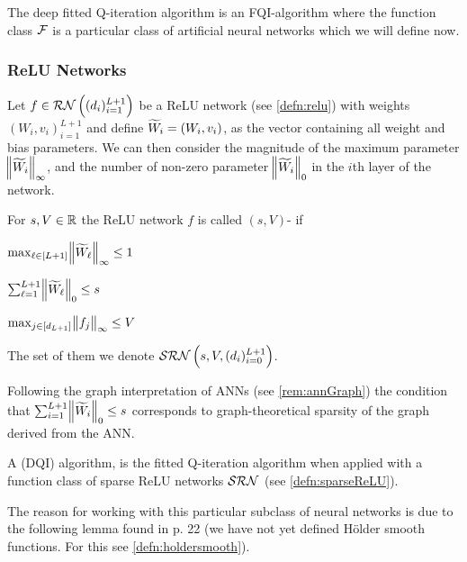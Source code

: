 The deep fitted Q-iteration algorithm is an FQI-algorithm where the
function class $\mathcal{F}$ is a particular class of artificial neural networks
which we will define now.

\subsubsection{ReLU Networks}
Let $f \in \mathcal{RN}\left((d_i)_{i=1}^{L+1} \right)$ be a
ReLU network (see \cref{defn:relu})
with weights $(W_i, v_i)_{i=1}^{L+1}$
and define $\widetilde{W}_i = (W_i, v_i)$, 
as the vector containing all weight and bias parameters.
We can then consider the magnitude of the maximum parameter
$\norm{\widetilde{W}_i}_\infty$,
and the number of non-zero parameter $\norm{\widetilde{W}_i}_0$
in the $i$th layer of the network.

\begin{defn}
  For $s,V \in \mathbb{R}$ the ReLU network $f$
  is called $(s,V)$- if
  \begin{center}
    \begin{enumerate*}[label=\arabic*., itemjoin=\hspace{0.3in}]
      \item $\max_{\ell \in [L+1]} \norm{\widetilde{W}_\ell}_\infty \leq 1$
      \item $\sum_{\ell = 1}^{L+1} \norm{\widetilde{W}_\ell}_0 \leq s$
      \item $\max_{j \in [d_{L+1}]} \norm{f_j}_\infty \leq V$
    \end{enumerate*}
  \end{center}
  The set of them we denote $\mathcal{SRN}\left(s, V, (d_i)_{i=0}^{L+1}\right)$.
  \label{defn:sparseReLU}
\end{defn}

\begin{rem}
  Following the graph interpretation of ANNs (see \cref{rem:annGraph})
  the condition that
  $\sum_{i=1}^{L+1} \norm{\widetilde{W}_i}_0 \leq s$
  corresponds to graph-theoretical sparsity of the graph derived from
  the ANN.
\end{rem}

\begin{defn}
  A  (DQI) algorithm,
  is the fitted Q-iteration algorithm when applied with a function class
  of sparse ReLU networks $\mathcal{SRN}$ (see \cref{defn:sparseReLU}).
\end{defn}

The reason for working with this particular subclass of neural networks
is due to the following lemma found in
 p. 22 (we have not yet defined Hölder smooth functions.
For this see \cref{defn:holdersmooth}).

